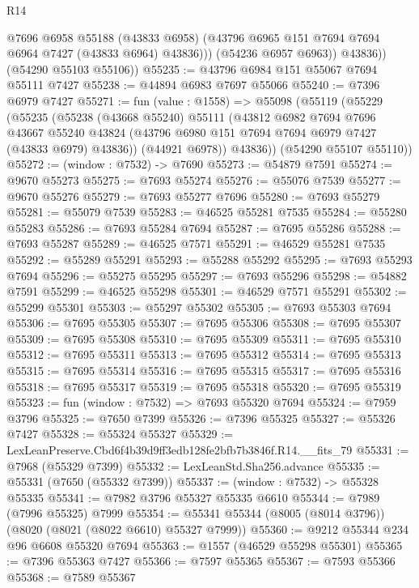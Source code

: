 \begin{lexlean}{R14}
\begin{coremodule}
                @7696
                @6958
                @55188
                (@43833 @6958)
                (@43796 @6965 @151 @7694 @7694 @6964 @7427 (@43833 @6964) @43836)))
            (@54236 @6957 @6963))
          @43836))
      (@54290 @55103 @55106))
@55235 := @43796 @6984 @151 @55067 @7694 @55111 @7427
@55238 := @44894 @6983 @7697 @55066
@55240 := @7396 @6979 @7427
@55271 := fun (value : @1558) =>
  @55098
    (@55119
      (@55229
        (@55235
          (@55238
            (@43668 @55240)
            @55111
            (@43812
              @6982
              @7694
              @7696
              @43667
              @55240
              @43824
              (@43796 @6980 @151 @7694 @7694 @6979 @7427 (@43833 @6979) @43836))
            (@44921 @6978))
          @43836))
      (@54290 @55107 @55110))
@55272 := (window : @7532) -> @7690
@55273 := @54879 @7591
@55274 := @9670 @55273
@55275 := @7693 @55274
@55276 := @55076 @7539
@55277 := @9670 @55276
@55279 := @7693 @55277 @7696
@55280 := @7693 @55279
@55281 := @55079 @7539
@55283 := @46525 @55281 @7535
@55284 := @55280 @55283
@55286 := @7693 @55284 @7694
@55287 := @7695 @55286
@55288 := @7693 @55287
@55289 := @46525 @7571
@55291 := @46529 @55281 @7535
@55292 := @55289 @55291
@55293 := @55288 @55292
@55295 := @7693 @55293 @7694
@55296 := @55275 @55295
@55297 := @7693 @55296
@55298 := @54882 @7591
@55299 := @46525 @55298
@55301 := @46529 @7571 @55291
@55302 := @55299 @55301
@55303 := @55297 @55302
@55305 := @7693 @55303 @7694
@55306 := @7695 @55305
@55307 := @7695 @55306
@55308 := @7695 @55307
@55309 := @7695 @55308
@55310 := @7695 @55309
@55311 := @7695 @55310
@55312 := @7695 @55311
@55313 := @7695 @55312
@55314 := @7695 @55313
@55315 := @7695 @55314
@55316 := @7695 @55315
@55317 := @7695 @55316
@55318 := @7695 @55317
@55319 := @7695 @55318
@55320 := @7695 @55319
@55323 := fun (window : @7532) => @7693 @55320 @7694
@55324 := @7959 @3796
@55325 := @7650 @7399
@55326 := @7396 @55325
@55327 := @55326 @7427
@55328 := @55324 @55327
@55329 := LexLeanPreserve.Cbd6f4b39d9ff3edb128fe2bfb7b3846f.R14.__fits_79
@55331 := @7968 (@55329 @7399)
@55332 := LexLeanStd.Sha256.advance
@55335 := @55331 (@7650 (@55332 @7399))
@55337 := (window : @7532) -> @55328 @55335
@55341 := @7982 @3796 @55327 @55335 @6610
@55344 := @7989 (@7996 @55325) @7999
@55354 := @55341 @55344 (@8005 (@8014 @3796)) (@8020 (@8021 (@8022 @6610) @55327 @7999))
@55360 := @9212 @55344 @234 @96 @6608 @55320 @7694
@55363 := @1557 (@46529 @55298 @55301)
@55365 := @7396 @55363 @7427
@55366 := @7597 @55365
@55367 := @7593 @55366
@55368 := @7589 @55367

\end{coremodule}
\end{lexlean}
